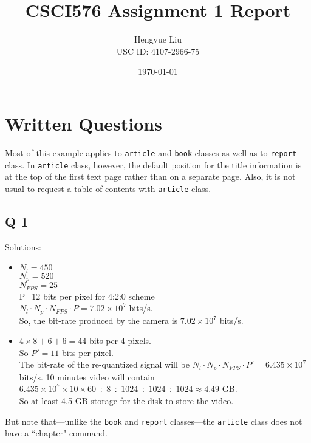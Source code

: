\documentclass[10pt]{report}            %
\title{\bf CSCI576 Assignment 1 Report}  %
\author{Hengyue Liu\\USC ID: 4107-2966-75}              %
\date{\today}                           %
\begin{document}
\maketitle                              %
\setcounter{page}{2}                    %
\tableofcontents                        %
\renewcommand{\chaptername}{Part}
\chapter{Written Questions}                %
Most of this example applies to \texttt{article} and \texttt{book} classes
as well as to \texttt{report} class. In \texttt{article} class, however,
the default position for the title information is at the top of
the first text page rather than on a separate page. Also, it is
not usual to request a table of contents with \texttt{article} class.
 
\section*{Q 1}                  %
Solutions:
\begin{itemize}
\item                           %
 $N_{l}=450$\\                                %
 $N_{p}=520$\\
 $N_{FPS}=25$\\ 
 P=12 bits per pixel for 4:2:0 scheme\\
 $N_l \cdot N_p \cdot N_{FPS} \cdot P = 7.02\times10^7$ bits/s.\\
 So, the bit-rate produced by the camera is $7.02\times10^7$ bits/s.\\
\item
$4 \times 8 + 6 + 6 = 44$ bits per 4 pixels.\\
So $P'=11$ bits per pixel.\\
The bit-rate of the re-quantized signal will be $N_l \cdot N_p \cdot N_{FPS} \cdot P'= 6.435\times10^7$ bits/s. 10 minutes video will contain $6.435 \times10^7 \times 10 \times 60 \div 8 \div 1024 \div 1024 \div 1024 \approx 4.49$ GB.\\
So at least 4.5 GB storage for the disk to store the video.\\
 \end{itemize}   
But note that---unlike the \texttt{book} and \texttt{report} classes---the
\texttt{article} class does not have a ``chapter" command.
 
\end{document}
